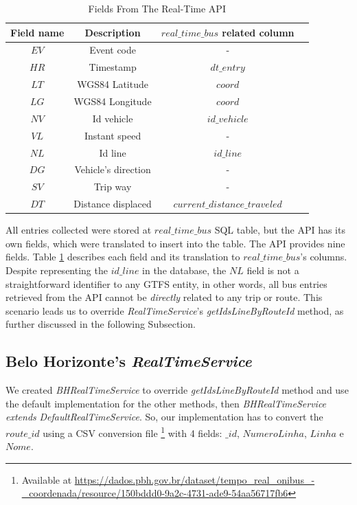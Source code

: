 \begin{table}[h]
\centering
\caption{Fields From The Real-Time API } 
\begin{tabular}{ |c|c|c|c| } 
\hline
Field name & Description & $real\_time\_bus$ related column \\
\hline
$EV$& Event code & - \\ 
\hline
$HR$& Timestamp & $dt\_entry$ \\ 
\hline
$LT$& WGS84 Latitude & $coord$ \\ 
\hline
$LG$& WGS84 Longitude & $coord$ \\ 
\hline
$NV$& Id vehicle & $id\_vehicle$ \\ 
\hline
$VL$& Instant speed & - \\ 
\hline
$NL$& Id line & $id\_line$ \\ 
\hline
$DG$& Vehicle's direction & - \\ 
\hline
$SV$& Trip way & - \\ 
\hline
$DT$& Distance displaced & $current\_distance\_traveled$ \\ 
\hline
\end{tabular}
\label{tab:entries-desc}
\end{table}

All entries collected were stored at $real\_time\_bus$ SQL table, but the API
has its own fields, which were translated to insert into the table. The API provides
nine fields. Table \ref{tab:entries-desc} describes each field and its translation to 
$real\_time\_bus$'s columns. 
Despite representing the $id\_line$ in the database, the $NL$ field 
is not a straightforward identifier to any GTFS entity, 
in other words, all bus entries retrieved from the API cannot be {\em directly} 
related to any trip or route. This scenario leads us to override  
\textit{RealTimeService}'s \textit{getIdsLineByRouteId} method, as further discussed
in the following Subsection.


\subsection{Belo Horizonte's \textit{RealTimeService}}
We created \textit{BHRealTimeService} to override \textit{getIdsLineByRouteId} method and use the default implementation for
the other methods, then \textit{BHRealTimeService} {\em extends} \textit{DefaultRealTimeService}. So, our implementation has to convert the
$route\_id$ using a \ac{CSV} conversion file
\footnote{Available at \url{https://dados.pbh.gov.br/dataset/tempo_real_onibus_-_coordenada/resource/150bddd0-9a2c-4731-ade9-54aa56717fb6}}
with 4 fields: $\_id$, $NumeroLinha$, $Linha$ e $Nome$. 

